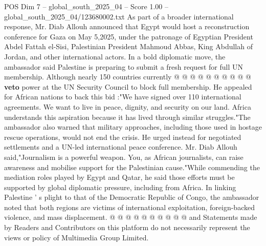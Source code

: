 \begin{textsample}{POS Dim 7 – global\_south\_2025\_04 – Score 1.00 – global\_south\_2025\_04/123680002.txt}
As part of a broader international response, Mr.
Diab Allouh announced that Egypt would host a reconstruction conference for Gaza on May 5,2025, under the patronage of Egyptian President Abdel Fattah el-Sisi, Palestinian President Mahmoud Abbas, King Abdullah of Jordan, and other international actors.
In a bold diplomatic move, the ambassador said Palestine is preparing to submit a fresh request for full UN membership.
Although nearly 150 countries currently @ @ @ @ @ @ @ @ @ @ \textbf{veto} power at the UN Security Council to block full membership.
He appealed for African nations to back this bid :"We have signed over 110 international agreements.
We want to live in peace, dignity, and security on our land.
Africa understands this aspiration because it has lived through similar struggles."The ambassador also warned that military approaches, including those used in hostage rescue operations, would not end the crisis.
He urged instead for negotiated settlements and a UN-led international peace conference.
Mr.
Diab Allouh said,"Journalism is a powerful weapon.
You, as African journalists, can raise awareness and mobilise support for the Palestinian cause."While commending the mediation roles played by Egypt and Qatar, he said those efforts must be supported by global diplomatic pressure, including from Africa.
In linking Palestine ' s plight to that of the Democratic Republic of Congo, the ambassador noted that both regions are victims of international exploitation, foreign-backed violence, and mass displacement. @ @ @ @ @ @ @ @ @ @ and Statements made by Readers and Contributors on this platform do not necessarily represent the views or policy of Multimedia Group Limited.

\end{textsample}
